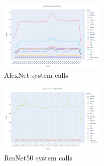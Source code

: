 \documentclass[conference]{IEEEtran}
\begin{document}
\begin{figure}[htbp]
	\centering
	\includegraphics[width=0.45\textwidth]{images/syscount_alexnet.pdf}
	\caption{AlexNet system calls}
	\label{fig:alex}
\end{figure}

\begin{figure}[htbp]
	\centering
	\includegraphics[width=0.45\textwidth]{images/syscount_resnet50.pdf}
	\caption{ResNet50 system calls}
	\label{fig:res}
\end{figure}

\end{document}
